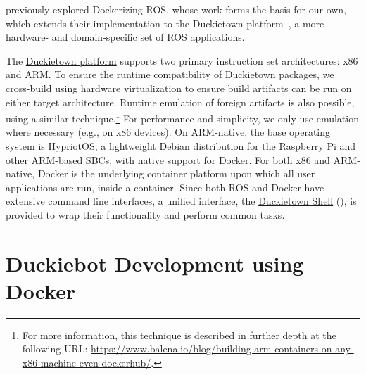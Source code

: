\citet{white2017ros-docker} previously explored Dockerizing ROS, whose work forms the basis for our own, which extends their implementation to the Duckietown platform~\citep{paull2017duckietown}, a more hardware- and domain-specific set of ROS applications.

The \href{https://www.duckietown.org}{Duckietown platform} supports two primary instruction set architectures: x86 and ARM. To ensure the runtime compatibility of Duckietown packages, we cross-build using hardware virtualization to ensure build artifacts can be run on either target architecture. Runtime emulation of foreign artifacts is also possible, using a similar technique.\hspace{-.08em}\footnote{For more information, this technique is described in further depth at the following URL: \url{https://www.balena.io/blog/building-arm-containers-on-any-x86-machine-even-dockerhub/}.} For performance and simplicity, we only use emulation where necessary (e.g., on x86 devices). On ARM-native, the base operating system is \hyperref[subsec:hypriot]{HypriotOS}, a lightweight Debian distribution for the Raspberry Pi and other ARM-based SBCs, with native support for Docker. For both x86 and ARM-native, Docker is the underlying container platform upon which all user applications are run, inside a container. Since both ROS and Docker have extensive command line interfaces, a unified interface, the \href{https://github.com/duckietown/duckietown-shell}{Duckietown Shell} (), is provided to wrap their functionality and perform common tasks.

\section{Duckiebot Development using Docker}

